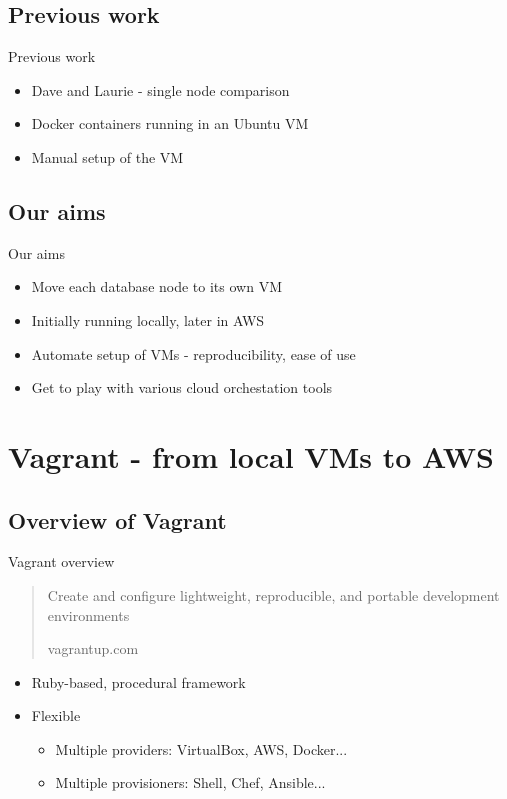 \documentclass[xcolor=dvipsnames]{beamer}
\begin{document}
\subsection{Previous work}
\begin{frame}{Previous work}
  \begin{itemize}
    \item Dave and Laurie - single node comparison
    \item Docker containers running in an Ubuntu VM
    \item Manual setup of the VM
  \end{itemize}
\end{frame}

\subsection{Our aims}
\begin{frame}{Our aims}
  \begin{itemize}
    \item Move each database node to its own VM
    \item Initially running locally, later in AWS
    \item Automate setup of VMs - reproducibility, ease of use
    \item Get to play with various cloud orchestation tools \smiley
  \end{itemize}
\end{frame}


\section[Vagrant]{Vagrant - from local VMs to AWS}

\subsection{Overview of Vagrant}
\begin{frame}{Vagrant overview}
  \begin{block}{}
    \begin{quote}
      Create and configure lightweight, reproducible, and portable development environments

      \small{\hfill vagrantup.com}
    \end{quote}
  \end{block}
  \pause
  \begin{itemize}
    \item Ruby-based, procedural framework
    \item Flexible
    \begin{itemize}
      \item Multiple providers: VirtualBox, AWS, Docker...
      \item Multiple provisioners: Shell, Chef, Ansible...
    \end{itemize}
  \end{itemize}
\end{frame}
\end{document}
